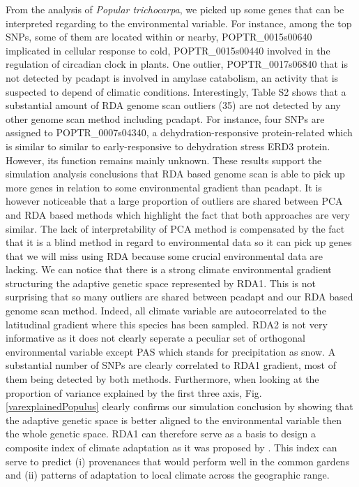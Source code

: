 \documentclass[a4paper,times,10pt,authoryear]{article}%
\begin{document}
From the analysis of \textit{Popular trichocarpa}, we picked up some genes that can be interpreted regarding to the environmental variable. For instance, among the top SNPs, some of them are located within or nearby, POPTR\_0015s00640 implicated in cellular response to cold, POPTR\_0015s00440 involved in the regulation of circadian clock in plants. One outlier, POPTR\_0017s06840 that is not detected by pcadapt is involved in amylase catabolism, an activity that is suspected to depend of climatic conditions. Interestingly, Table S2 shows that a substantial amount of RDA genome scan outliers (35) are not detected by any other genome scan method including pcadapt. For instance, four SNPs are assigned to POPTR\_0007s04340, a dehydration-responsive protein-related which is similar to similar to early-responsive to dehydration stress ERD3 protein. However, its function remains mainly unknown. These results support the simulation analysis conclusions that RDA based genome scan is able to pick up more genes in relation to some environmental gradient than pcadapt. It is however noticeable that a large proportion of outliers are shared between PCA and RDA based methods which highlight the fact that both approaches are very similar. The lack of interpretability of PCA method is compensated by the fact that it is a blind method in regard to environmental data so it can pick up genes that we will miss using RDA because some crucial environmental data are lacking.
We can notice that there is a strong climate environmental gradient structuring the adaptive genetic space represented by RDA1. This is not surprising that so many outliers are shared between pcadapt and our RDA based genome scan method. Indeed, all climate variable are autocorrelated to the latitudinal gradient where this species has been sampled. RDA2 is not very informative as it does not clearly seperate a peculiar set of orthogonal environmental variable except PAS which stands for precipitation as snow. A substantial number of SNPs are clearly correlated to RDA1 gradient, most of them being detected by both methods. Furthermore, when looking at the proportion of variance explained by the first three axis, Fig. \ref{varexplainedPopulus} clearly confirms our simulation conclusion by showing that the adaptive genetic space is better aligned to the environmental variable then the whole genetic space. RDA1 can therefore serve as a basis to design a composite index of climate adaptation as it was proposed by \citet{Steane2014a}. This index can serve to predict (i) provenances that would perform well in the common gardens and (ii) patterns of adaptation to local climate across the geographic range.
\end{document}
